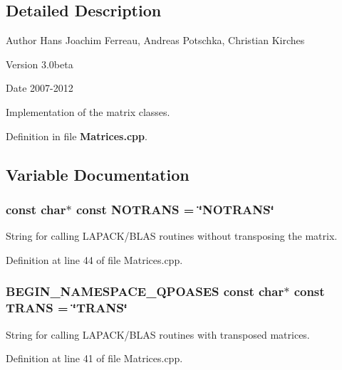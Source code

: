 \subsection{Detailed Description}
\begin{DoxyAuthor}{Author}
Hans Joachim Ferreau, Andreas Potschka, Christian Kirches 
\end{DoxyAuthor}
\begin{DoxyVersion}{Version}
3.0beta 
\end{DoxyVersion}
\begin{DoxyDate}{Date}
2007-\/2012
\end{DoxyDate}
Implementation of the matrix classes. 

Definition in file {\bf Matrices.cpp}.



\subsection{Variable Documentation}
\subsubsection[{NOTRANS}]{\setlength{\rightskip}{0pt plus 5cm}const char$\ast$ const {\bf NOTRANS} = \char`\"{}NOTRANS\char`\"{}}\label{Matrices_8cpp_a36a7cf4c2c0701885198a994a267966c}
String for calling LAPACK/BLAS routines without transposing the matrix. 

Definition at line 44 of file Matrices.cpp.

\subsubsection[{TRANS}]{\setlength{\rightskip}{0pt plus 5cm}BEGIN\_\-NAMESPACE\_\-QPOASES const char$\ast$ const {\bf TRANS} = \char`\"{}TRANS\char`\"{}}\label{Matrices_8cpp_a4b6e2a35d324bb658c4d391cedbb7225}
String for calling LAPACK/BLAS routines with transposed matrices. 

Definition at line 41 of file Matrices.cpp.

